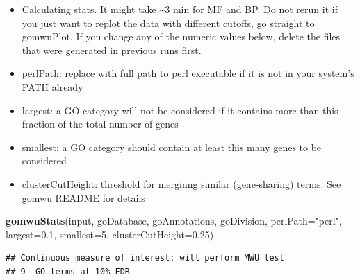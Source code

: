 \documentclass[
]{article}
\newenvironment{Shaded}{\begin{snugshade}}{\end{snugshade}}
\newcommand{\DataTypeTok}[1]{\textcolor[rgb]{0.13,0.29,0.53}{#1}}
\newcommand{\DecValTok}[1]{\textcolor[rgb]{0.00,0.00,0.81}{#1}}
\newcommand{\FloatTok}[1]{\textcolor[rgb]{0.00,0.00,0.81}{#1}}
\newcommand{\KeywordTok}[1]{\textcolor[rgb]{0.13,0.29,0.53}{\textbf{#1}}}
\newcommand{\NormalTok}[1]{#1}
\newcommand{\StringTok}[1]{\textcolor[rgb]{0.31,0.60,0.02}{#1}}
\providecommand{\tightlist}{%
  \setlength{\itemsep}{0pt}\setlength{\parskip}{0pt}}
\begin{document}
\begin{itemize}
\tightlist
\item
  Calculating stats. It might take \textasciitilde3 min for MF and BP.
  Do not rerun it if you just want to replot the data with different
  cutoffs, go straight to gomwuPlot. If you change any of the numeric
  values below, delete the files that were generated in previous runs
  first.
\item
  perlPath: replace with full path to perl executable if it is not in
  your system's PATH already
\item
  largest: a GO category will not be considered if it contains more than
  this fraction of the total number of genes
\item
  smallest: a GO category should contain at least this many genes to be
  considered
\item
  clusterCutHeight: threshold for merginng similar (gene-sharing) terms.
  See gomwu README for details
\end{itemize}

\begin{Shaded}
\begin{Highlighting}[]
\KeywordTok{gomwuStats}\NormalTok{(input, goDatabase, goAnnotations, goDivision,}
           \DataTypeTok{perlPath=}\StringTok{"perl"}\NormalTok{,}
           \DataTypeTok{largest=}\FloatTok{0.1}\NormalTok{,}
           \DataTypeTok{smallest=}\DecValTok{5}\NormalTok{,}
           \DataTypeTok{clusterCutHeight=}\FloatTok{0.25}\NormalTok{)}
\end{Highlighting}
\end{Shaded}

\begin{verbatim}
## Continuous measure of interest: will perform MWU test
## 9  GO terms at 10% FDR
\end{verbatim}
\end{document}
